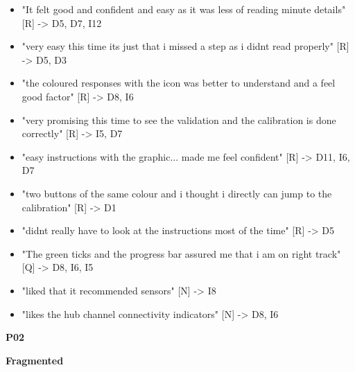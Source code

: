 \documentclass[
]{article}
\begin{document}
\begin{itemize}
\item
  "It felt good and confident and easy as it was less of reading minute details" {[}R{]} -\textgreater{} D5, D7, I12
\item
  "very easy this time its just that i missed a step as i didnt read properly" {[}R{]} -\textgreater{} D5, D3
\item
  "the coloured responses with the icon was better to understand and a feel good factor" {[}R{]} -\textgreater{} D8, I6
\item
  "very promising this time to see the validation and the calibration is done correctly" {[}R{]} -\textgreater{} I5, D7
\item
  "easy instructions with the graphic... made me feel confident" {[}R{]} -\textgreater{} D11, I6, D7
\item
  "two buttons of the same colour and i thought i directly can jump to the calibration" {[}R{]} -\textgreater{} D1
\item
  "didnt really have to look at the instructions most of the time" {[}R{]} -\textgreater{} D5
\item
  "The green ticks and the progress bar assured me that i am on right track" {[}Q{]} -\textgreater{} D8, I6, I5
\item
  "liked that it recommended sensors" {[}N{]} -\textgreater{} I8
\item
  "likes the hub channel connectivity indicators" {[}N{]} -\textgreater{} D8, I6
\end{itemize}

\textbf{P02}

\textbf{Fragmented}
\end{document}
